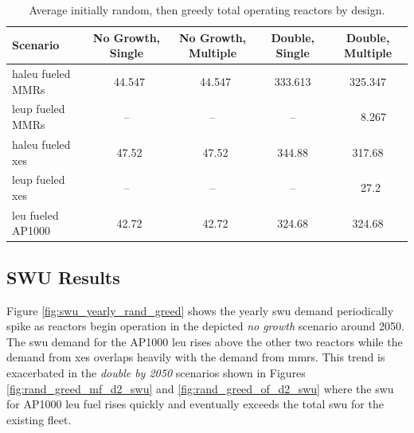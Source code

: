 \begin{table}[H]
    \centering
    \caption{Average initially random, then greedy total operating reactors by design.}
    \label{tab:rand_greed_reac_avg}
    \begin{tabular}{l c c c c}
       \hline
       Scenario & No Growth, Single & No Growth, Multiple & Double, Single & Double, Multiple  \\
       \hline
       \gls{haleu} fueled MMRs      & \textcolor{white}{0}44.547  & \textcolor{white}{0}44.547  & 333.613 & 325.347 \\
       \gls{leup} fueled MMRs       & --      & --      & --      & \textcolor{white}{00}8.267   \\
       \gls{haleu} fueled \gls{xe}s & \textcolor{white}{0}47.52   & \textcolor{white}{0}47.52   & 344.88  & 317.68  \\
       \gls{leup} fueled \gls{xe}s  & --      & --      & --      & \textcolor{white}{0}27.2    \\
       \gls{leu} fueled AP1000      & \textcolor{white}{0}42.72   & \textcolor{white}{0}42.72   & 324.68  & 324.68  \\
       \hline
    \end{tabular}
\end{table}

\subsection{SWU Results}
\label{sec:rand_greed_swu}

Figure \ref{fig:swu_yearly_rand_greed} shows the yearly \gls{swu} demand periodically spike as reactors begin operation in the depicted \textit{no growth} scenario around 2050. The \gls{swu} demand for the AP1000 \gls{leu} rises above the other two reactors while the demand from \glspl{xe} overlaps heavily with the demand from \glspl{mmr}. This trend is exacerbated in the \textit{double by 2050} scenarios shown in Figures \ref{fig:rand_greed_mf_d2_swu} and \ref{fig:rand_greed_of_d2_swu} where the \gls{swu} for AP1000 \gls{leu} fuel rises quickly and eventually exceeds the total \gls{swu} for the existing fleet.

